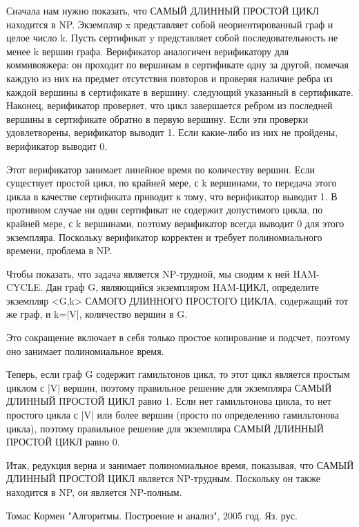 \documentclass[spec, och, labwork]{shiza}
\begin{document}
Сначала нам нужно показать, что САМЫЙ ДЛИННЫЙ ПРОСТОЙ ЦИКЛ находится в NP. Экземпляр x представляет собой 
неориентированный граф и целое число k. Пусть сертификат y представляет собой последовательность не менее k 
вершин графа. Верификатор аналогичен верификатору для коммивояжера: он проходит по вершинам в сертификате одну 
за другой, помечая каждую из них на предмет отсутствия повторов и проверяя наличие ребра из каждой вершины в 
сертификате в вершину. следующий указанный в сертификате. Наконец, верификатор проверяет, что цикл завершается 
ребром из последней вершины в сертификате обратно в первую вершину. Если эти проверки удовлетворены, верификатор 
выводит 1. Если какие-либо из них не пройдены, верификатор выводит 0.

Этот верификатор занимает линейное время по количеству вершин. Если существует простой цикл, по крайней мере, с k 
вершинами, то передача этого цикла в качестве сертификата приводит к тому, что верификатор выводит 1. В противном 
случае ни один сертификат не содержит допустимого цикла, по крайней мере, с k вершинами, поэтому верификатор всегда
выводит 0 для этого экземпляра. Поскольку верификатор корректен и требует полиномиального времени, проблема в NP.

Чтобы показать, что задача является NP-трудной, мы сводим к ней HAM-CYCLE. Дан граф G, являющийся экземпляром HAM-ЦИКЛ,
определите экземпляр <G,k> САМОГО ДЛИННОГО ПРОСТОГО ЦИКЛА, содержащий тот же граф, и k=|V|, количество вершин в G.

Это сокращение включает в себя только простое копирование и подсчет, поэтому оно занимает полиномиальное время.

Теперь, если граф G содержит гамильтонов цикл, то этот цикл является простым циклом с |V| вершин, поэтому 
правильное решение для экземпляра САМЫЙ ДЛИННЫЙ ПРОСТОЙ ЦИКЛ равно 1. Если нет гамильтонова цикла, то нет простого
цикла с |V| или более вершин (просто по определению гамильтонова цикла), поэтому правильное решение для экземпляра
САМЫЙ ДЛИННЫЙ ПРОСТОЙ ЦИКЛ равно 0.

Итак, редукция верна и занимает полиномиальное время, показывая, что САМЫЙ ДЛИННЫЙ ПРОСТОЙ ЦИКЛ является NP-трудным.
Поскольку он также находится в NP, он является NP-полным.

\newpage
    
\begin{thebibliography}{3}
        Томас Кормен "Алгоритмы. Построение и анализ", 2005 год. Яз. рус.
    \end{thebibliography}
\end{document}
